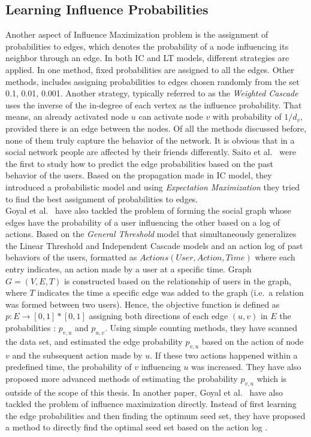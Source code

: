 \documentclass[english]{tktltiki}
\begin{document}
\subsection{Learning Influence Probabilities}
\label{subsec:learninginfprob}
Another aspect of Influence Maximization problem is the assignment of probabilities to edges, which denotes the probability of a node influencing its neighbor through an edge. In both IC and LT models, different strategies are applied. In one method, fixed probabilities are assigned to all the edges. Other methods, includes assigning probabilities to edges chosen randomly from the set {0.1, 0.01, 0.001}. Another strategy, typically referred to as the \textit{Weighted Cascade} uses the inverse of the in-degree of each vertex as the influence probability. That means, an already activated node $u$ can activate node $v$ with probability of $1/d_v$, provided there is an edge between the nodes. Of all the methods discussed before, none of them truly capture the behavior of the network. It is obvious that in a social network people are affected by their friends differently. Saito et al.\ \cite{saito08} were the first to study how to predict the edge probabilities based on the past behavior of the users. Based on the propagation made in IC model, they introduced a probabilistic model and using \textit{Expectation Maximization} they tried to find the best assignment of probabilities to edges. \\
Goyal et al.\ \cite{goyal10} have also tackled the problem of forming the social graph whose edges have the probability of a user influencing the other based on a log of actions. Based on the \textit{General Threshold} model that simultaneously 
generalizes the Linear Threshold and Independent Cascade models and an action log of past behaviors of the users, formatted as $Actions(User,Action, Time)$ where each entry indicates, an action made by a user at a specific time. 
Graph $G = (V,E,T)$ is constructed based on the relationship of users in the graph, where $T$ indicates the time a specific edge was added to the graph (i.e.\ a relation was formed between two users). Hence, the objective function is defined as $p : E \rightarrow [0,1] * [0,1]$ assigning both directions of each edge $(u,v)$ in $E$ the probabilities : $p_{v,u}$ and $p_{u,v}$.
Using simple counting methods, they have scanned the data set, and estimated the edge probability $p_{v,u}$ based on the action of node $v$ and the subsequent action made by $u$. If these two actions happened within a predefined time, the probability of $v$ influencing $u$ was increased. They have also proposed more advanced methods of estimating the probability $p_{v,u}$ which is outside of the scope of this thesis.
In another paper, Goyal et al.\ \cite{goyal11} have also tackled the problem of influence maximization directly. Instead of first learning the edge probabilities and then finding the optimum seed set, they have proposed a method to directly find the optimal seed set based on the action log .
\newpage
\end{document}
